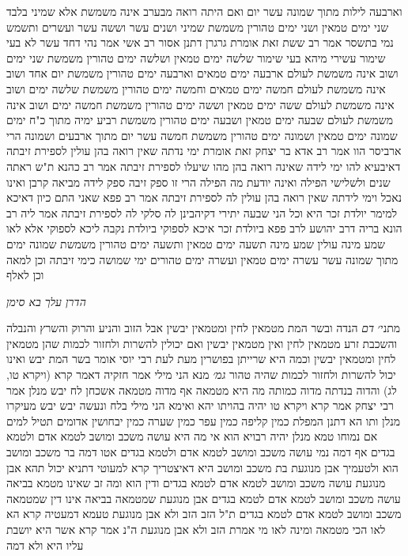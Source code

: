\documentclass[12pt, openany]{book}
\begin{document}
{וארבעה לילות מתוך שמונה עשר יום  ואם היתה רואה מבערב אינה משמשת אלא שמיני בלבד 
שני ימים טמאין ושני ימים טהורין משמשת שמיני ושנים עשר וששה עשר ועשרים 
ותשמש נמי בתשסר  אמר רב ששת  זאת אומרת גרגרן דתנן אסור 
רב אשי אמר  נהי דחד עשר לא בעי שימור עשירי מיהא בעי שימור 
שלשה ימים טמאין ושלשה ימים טהורין משמשת שני ימים ושוב אינה משמשת לעולם 
ארבעה ימים טמאים וארבעה ימים טהורין משמשת יום אחד ושוב אינה משמשת לעולם 
חמשה ימים טמאים וחמשה ימים טהורין משמשת שלשה ימים ושוב אינה משמשת לעולם  ששה ימים טמאין וששה ימים טהורין משמשת חמשה ימים ושוב אינה משמשת לעולם 
שבעה ימים טמאין ושבעה ימים טהורין משמשת רביע ימיה מתוך כ"ח ימים 
שמונה ימים טמאין ושמונה ימים טהורין משמשת חמשה עשר יום מתוך ארבעים ושמונה 
הרי ארביסר הוו 
אמר רב אדא בר יצחק  זאת אומרת  ימי נדתה שאין רואה בהן עולין לספירת זיבתה  דאיבעיא להו
ימי לידה שאינה רואה בהן מהו שיעלו לספירת זיבתה 
אמר רב כהנא  ת"ש ראתה שנים ולשלישי הפילה ואינה יודעת מה הפילה
הרי זו ספק זיבה ספק לידה 
מביאה קרבן ואינו נאכל וימי לידתה שאין רואה בהן עולין לה לספירת זיבתה 
אמר רב פפא  שאני התם כיון דאיכא למימר יולדת זכר היא וכל הני שבעה יתירי דקיהבינן לה סלקי לה לספירת זיבתה 
אמר ליה רב הונא בריה דרב יהושע לרב פפא  ביולדת זכר איכא לספוקי ביולדת נקבה ליכא לספוקי  אלא לאו שמע מינה  עולין שמע מינה 
תשעה ימים טמאין ותשעה ימים טהורין משמשת שמונה ימים מתוך שמונה עשר 
עשרה ימים טמאין ועשרה ימים טהורים ימי שמושה כימי זיבתה וכן למאה וכן לאלף
\par \par {\large\emph{הדרן עלך בא סימן}}\par \par 
מתני׳ {\large\emph{דם}} הנדה ובשר המת מטמאין לחין ומטמאין יבשין אבל הזוב והניע והרוק והשרץ והנבלה והשכבת זרע מטמאין לחין ואין מטמאין יבשין  ואם יכולין להשרות ולחזור לכמות שהן מטמאין לחין ומטמאין יבשין 
וכמה היא שרייתן  בפושרין מעת לעת  רבי יוסי אומר  בשר המת יבש ואינו יכול להשרות ולחזור לכמות שהיה טהור
{\large\emph{גמ׳}} מנא הני מילי אמר חזקיה  דאמר קרא (ויקרא טו, לג) והדוה בנדתה מדוה כמותה מה היא מטמאה אף מדוה מטמאה 
אשכחן לח יבש מנלן  אמר רבי יצחק  אמר קרא {ויקרא טו } יהיה בהויתו יהא 
ואימא  הני מילי בלח ונעשה יבש יבש מעיקרו מנלן  ותו הא דתנן  המפלת כמין קליפה כמין עפר כמין שערה כמין יבחושין אדומים תטיל למים אם נמוחו טמא מנלן  יהיה רבויא הוא 
אי מה היא עושה משכב ומושב לטמא אדם ולטמא בגדים אף דמה נמי עושה משכב ומושב לטמא אדם ולטמא בגדים  אטו דמה בר משכב ומושב הוא 
ולטעמיך אבן מנוגעת בת משכב ומושב היא דאיצטריך קרא למעוטי  דתניא  יכול תהא אבן מנוגעת עושה משכב ומושב לטמא אדם לטמא בגדים 
ודין הוא ומה זב שאינו מטמא בביאה עושה משכב ומושב לטמא אדם לטמא בגדים אבן מנוגעת שמטמאה בביאה אינו דין שמטמאה משכב ומושב לטמא אדם לטמא בגדים
ת"ל הזב הזב ולא אבן מנוגעת  טעמא דמעטיה קרא הא לאו הכי מטמאה 
ומינה לאו מי אמרת הזב ולא אבן מנוגעת ה"נ אמר קרא  אשר היא יושבת עליו היא ולא דמה}
\end{document}
